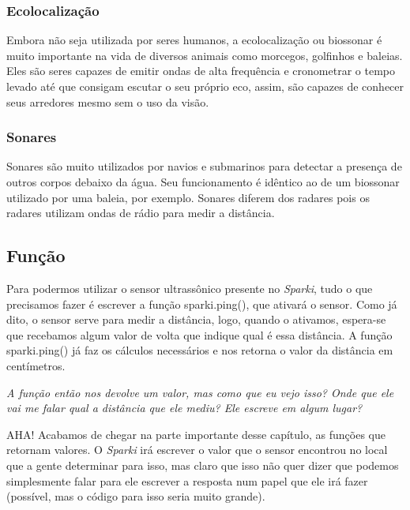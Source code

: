 \documentclass[conference]{IEEEtran}
\begin{document}
\begin{center}
    \subsubsection{Ecolocalização}    
\end{center}
    \par
    Embora não seja utilizada por seres humanos, a ecolocalização ou biossonar é muito importante na vida de diversos animais como morcegos, golfinhos e baleias. Eles são seres capazes de emitir ondas de alta frequência e cronometrar o tempo levado até que consigam escutar o seu próprio eco, assim, são capazes de conhecer seus arredores mesmo sem o uso da visão.
\begin{center}
    \subsubsection{Sonares}    
\end{center}
    \par
    Sonares são muito utilizados por navios e submarinos para detectar a presença de outros corpos debaixo da água. Seu funcionamento é idêntico ao de um biossonar utilizado por uma baleia, por exemplo. Sonares diferem dos radares pois os radares utilizam ondas de rádio para medir a distância.
\begin{center}
    \subsection{Função}    
\end{center}
    \par
    Para podermos utilizar o sensor ultrassônico presente no \textit{Sparki}, tudo o que precisamos fazer é escrever a função { \selectfont sparki.ping()}, que ativará o sensor. Como já dito, o sensor serve para medir a distância, logo, quando o ativamos, espera-se que recebamos algum valor de volta que indique qual é essa distância. A função{ \selectfont sparki.ping()} já faz os cálculos necessários e nos retorna o valor da distância em centímetros.
    \par
    \textit{A função então nos devolve um valor, mas como que eu vejo isso? Onde que ele vai me falar qual a distância que ele mediu? Ele escreve em algum lugar?}
    \par
    AHA! Acabamos de chegar na parte importante desse capítulo, as funções que retornam valores. O \textit{Sparki} irá escrever o valor que o sensor encontrou no local que a gente determinar para isso, mas claro que isso não quer dizer que podemos simplesmente falar para ele escrever a resposta num papel que ele irá fazer (possível, mas o código para isso seria muito grande).
\end{document}
